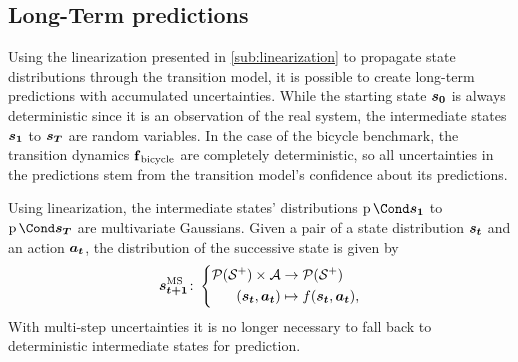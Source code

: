 \subsection{Long-Term predictions}
Using the linearization presented in \cref{sub:linearization} to propagate state distributions through the transition model, it is possible to create long-term predictions with accumulated uncertainties.
While the starting state $\bm{s_0}$ is always deterministic since it is an observation of the real system, the intermediate states $\bm{s_1}$ to $\bm{s_T}$ are random variables.
In the case of the bicycle benchmark, the transition dynamics $\operatorname{\operatorname{\mathbf{f}}_{\text{bicycle}}}$ are completely deterministic, so all uncertainties in the predictions stem from the transition model's confidence about its predictions.

Using linearization, the intermediate states' distributions $\Prob{\rv{s_1}}$ to $\Prob{\rv{s_T}}$ are multivariate Gaussians.
Given a pair of a state distribution $\bm{s_t}$ and an action $\bm{a_t}$, the distribution of the successive state is given by
\begin{align}
    \bm{s_{t+1}}^{\text{MS}} \colon \left\{
        \begin{aligned}
            \operatorname{\mathcal{P}}(\mathcal{S}^+) \times \mathcal{A} &\to \operatorname{\mathcal{P}}(\mathcal{S}^+) \\
            (\bm{s_t}, \bm{a_t}) &\mapsto f(\bm{s_t}, \bm{a_t}),
    \end{aligned}
    \right.
\end{align}
With multi-step uncertainties it is no longer necessary to fall back to deterministic intermediate states for prediction.

